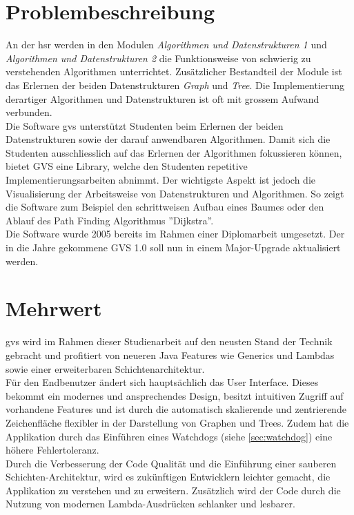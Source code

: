 \documentclass[11pt,a4paper,english,oneside]{book}
\numberwithin{equation}{chapter}
\begin{document}
	\section{Problembeschreibung}
	An der \gls{hsr} werden in den Modulen \textit{Algorithmen und Datenstrukturen 1} und \textit{Algorithmen und Datenstrukturen 2} die Funktionsweise von schwierig zu verstehenden Algorithmen unterrichtet. Zusätzlicher Bestandteil der Module ist das Erlernen der beiden Datenstrukturen \textit{Graph} und \textit{Tree}. Die Implementierung derartiger Algorithmen und Datenstrukturen ist oft mit grossem Aufwand verbunden. \\
	Die Software \gls{gvs} unterstützt Studenten beim Erlernen der beiden Datenstrukturen sowie der darauf anwendbaren Algorithmen. Damit sich die Studenten ausschliesslich auf das Erlernen der Algorithmen fokussieren können, bietet GVS eine Library, welche den Studenten repetitive Implementierungsarbeiten abnimmt. Der wichtigste Aspekt ist jedoch die Visualisierung der Arbeitsweise von Datenstrukturen und Algorithmen. So zeigt die Software zum Beispiel den schrittweisen Aufbau eines Baumes oder den Ablauf des Path Finding Algorithmus ''Dijkstra''. \\
	Die Software wurde 2005 bereits im Rahmen einer Diplomarbeit umgesetzt. Der in die Jahre gekommene GVS 1.0 soll nun in einem Major-Upgrade aktualisiert werden.
	
	
	
	\section{Mehrwert}
	\gls{gvs} wird im Rahmen dieser Studienarbeit auf den neusten Stand der Technik gebracht und profitiert von neueren Java Features wie Generics und Lambdas sowie einer erweiterbaren Schichtenarchitektur. \\
	
	\noindent
	Für den Endbenutzer ändert sich hauptsächlich das User Interface. Dieses bekommt ein modernes und ansprechendes Design, besitzt intuitiven Zugriff auf vorhandene Features und ist durch die automatisch skalierende und zentrierende Zeichenfläche flexibler in der Darstellung von Graphen und Trees. Zudem hat die Applikation durch das Einführen eines Watchdogs (siehe \ref{sec:watchdog}) eine höhere Fehlertoleranz. \\
	
	\noindent
	Durch die Verbesserung der Code Qualität und die Einführung einer sauberen Schichten-Architektur, wird es zukünftigen Entwicklern leichter gemacht, die Applikation zu verstehen und zu erweitern.	Zusätzlich wird der Code durch die Nutzung von modernen Lambda-Ausdrücken schlanker und lesbarer.
	
\end{document}

